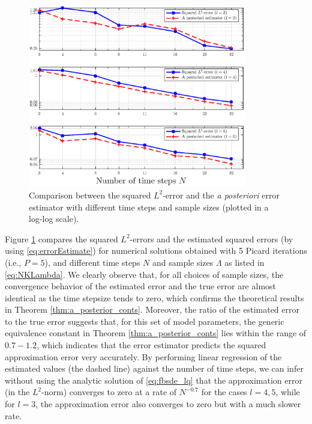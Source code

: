 \documentclass[11pt]{article}
\numberwithin{equation}{section}
\theoremstyle{definition}
\theoremstyle{remark}
\begin{document}
\begin{figure}[!h]
\centering
\includegraphics[height=8cm,keepaspectratio]{plot_diff_l_j_loglog}
\caption{
Comparison between the  squared $L^2$-error 
and  the \textit{a posteriori} error estimator with different 
time steps and sample sizes
(plotted in a log-log scale).}
\label{fig:TurePost}
\end{figure}

Figure \ref{fig:TurePost} compares  the  squared $L^2$-errors 
and  
the estimated squared errors (by using \eqref{eq:errorEstimate})
 for
numerical solutions obtained with 5 Picard iterations (i.e., $P=5$),
and
different  time steps $N$ and sample sizes $\Lambda$
as listed in \eqref{eq:NKLambda}.
We clearly observe that, for all choices of sample sizes,
the convergence behavior of  the estimated error 
and the true  error
are almost identical as  
the time stepsize tends to zero,
which confirms the theoretical results in Theorem \ref{thm:a_posterior_conts}.
Moreover, 
the ratio of the estimated error to the true error
suggests that,
for  this set of model parameters,
 the generic equivalence constant in Theorem \ref{thm:a_posterior_conts}
lies within the range of $0.7-1.2$,
which indicates that  the error estimator predicts  the  squared approximation error very accurately.
By performing linear regression of the estimated values (the dashed line) against the number of time steps,
we can infer 
without using the analytic solution of \eqref{eq:fbsde_lq}
that
 the approximation error 
 (in the $L^2$-norm)
 converges to zero at a rate of $N^{-0.7}$
 for the cases $l=4, 5$,
while for $l=3$, 
the approximation error also converges to zero but with a much slower rate.
\end{document}
